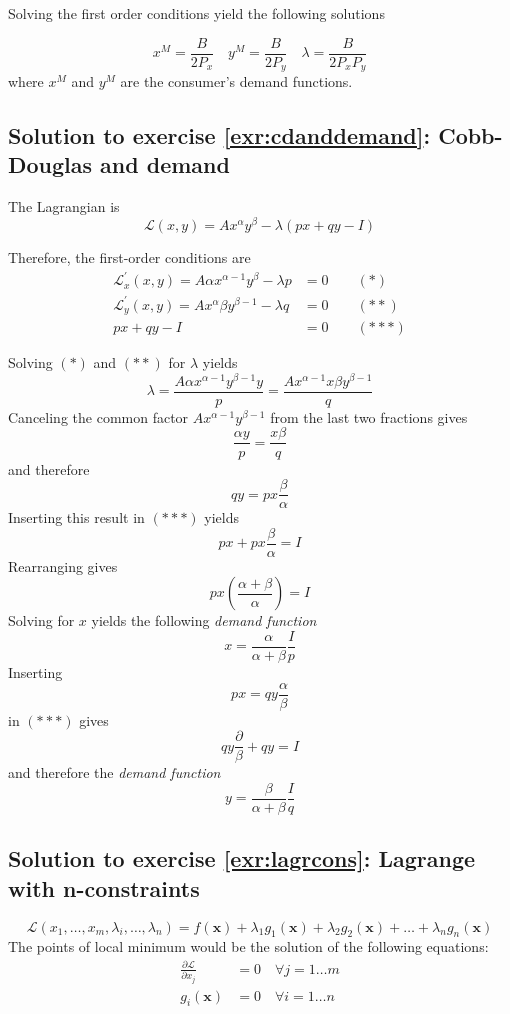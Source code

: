 \documentclass[
  12pt,
  oneside]{book}
\theoremstyle{definition}
\theoremstyle{definition}
\theoremstyle{definition}
\theoremstyle{definition}
\theoremstyle{remark}
\begin{document}
Solving the first order conditions yield the following solutions

\[
  x^{M}=\frac{B}{2 P_{x}} \quad y^{M}=\frac{B}{2 P_{y}} \quad \lambda=\frac{B}{2 P_{x} P_{y}}
\]
where \(x^{M}\) and \(y^{M}\) are the consumer's demand functions.

\hypertarget{sol:cdanddemand}{%
\subsection*{Solution to exercise \ref{exr:cdanddemand}: Cobb-Douglas and demand}\label{sol:cdanddemand}}

The Lagrangian is
\[
\mathcal{L}(x, y)=A x^{\alpha} y^{\beta}-\lambda(p x+q y-I)
\]

Therefore, the first-order conditions are
\[
    \begin{aligned}
        \mathcal{L}_{x}^{\prime}(x, y)=A \alpha x^{\alpha-1} y^{\beta}-\lambda p &=0 \qquad (*)\\
        \mathcal{L}_{y}^{\prime}(x, y)=A x^{\alpha} \beta y^{\beta-1}-\lambda q &=0  \qquad (**)\\
        p x+q y-I &=0  \qquad (***)
    \end{aligned}
\]

Solving \((*)\) and \((**)\) for \(\lambda\) yields
\[
\lambda=\frac{A \alpha x^{\alpha-1} y^{\beta-1} y}{p}=\frac{A x^{\alpha-1} x \beta y^{\beta-1}}{q}
\]
Canceling the common factor \(A x^{\alpha-1} y^{\beta-1}\) from the last two fractions gives
\[
    \frac{\alpha y}{p}=\frac{x \beta}{q}
\]
and therefore
\[
q y=p x \frac{\beta}{\alpha}
\]
Inserting this result in \((***)\) yields
\[
p x+p x \frac{\beta}{\alpha}=I
\]
Rearranging gives
\[
p x\left(\frac{\alpha+\beta}{\alpha}\right)=I
\]
Solving for \(x\) yields the following \textit{demand function}
\[
x=\frac{\alpha}{\alpha+\beta} \frac{I}{p}
\]
Inserting
\[
p x=q y \frac{\alpha}{\beta}
\]
in \((***)\) gives
\[
q y \frac{\partial}{\beta}+q y=I
\]
and therefore the \textit{demand function}
\[
y=\frac{\beta}{\alpha+\beta}  \frac{I}{q}
\]

\hypertarget{sol:lagrcons}{%
\subsection*{Solution to exercise \ref{exr:lagrcons}: Lagrange with n-constraints}\label{sol:lagrcons}}

\[
\mathcal{L}(x_1, \dots, x_m, \lambda_i, \dots, \lambda_n)=f(\mathbf{x})+\lambda_1 g_1(\mathbf{x})+\lambda_2 g_2(\mathbf{x})+\ldots+\lambda_n g_n(\mathbf{x})
\]
The points of local minimum would be the solution of the following equations:
\begin{align*}
    \frac{\partial \mathcal{L}}{\partial x_{j}} &=0 \quad \forall j=1 \dots m \\
    g_i(\mathbf{x}) &=0 \quad \forall i=1\dots n
\end{align*}
\end{document}
